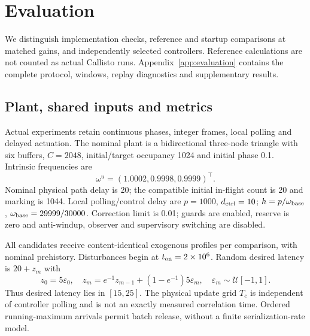 \section{Evaluation}
\label{sec:evaluation}

We distinguish implementation checks, reference and startup comparisons
at matched gains, and independently selected controllers. Reference calculations
are not counted as actual Callisto runs. Appendix~\ref{app:evaluation}
contains the complete protocol, windows, replay diagnostics and
supplementary results.

\subsection{Plant, shared inputs and metrics}
\label{subsec:eval_design}
Actual experiments retain continuous phases, integer frames, local
polling and delayed actuation. The nominal plant is a bidirectional
three-node triangle with six buffers, $C=2048$, initial/target
occupancy 1024 and initial phase 0.1. Intrinsic frequencies are
\[
 \omega^u=(1.0002,0.9998,0.9999)^\top.
\]
Nominal physical path delay is 20;
the compatible initial in-flight count is 20 and marking is 1044.
Local polling/control delay are $p=1000$, $d_{\rm ctrl}=10$;
$h=p/\omega_{\rm base}$, $\omega_{\rm base}=29999/30000$.
Correction limit is 0.01; guards are enabled, reserve is zero and
anti-windup, observer and supervisory switching are disabled.

All candidates receive content-identical exogenous profiles per
comparison, with nominal prehistory. Disturbances begin at
$t_{\rm on}=2\times10^6$. Random desired latency is $20+z_m$ with
\begin{equation}
 z_0=5\varepsilon_0,\quad
 z_m=e^{-1}z_{m-1}+(1-e^{-1})5\varepsilon_m,
 \quad\varepsilon_m\sim\mathcal U[-1,1].
 \label{eq:eval_random_profile}
\end{equation}
Thus desired latency lies in $[15,25]$. The physical update grid
$T_c$ is independent of controller polling and is not an exactly
measured correlation time. Ordered running-maximum arrivals permit
batch release, without a finite serialization-rate model.

